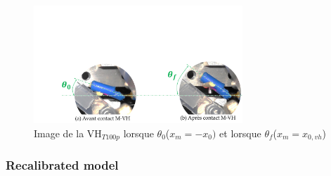\documentclass[3p,twocolumn,preprint]{elsarticle}
\begin{document}
\begin{figure}[!htbp]
	\begin{center}
		\captionsetup{justification=centering}
		\includegraphics[trim={4cm 0cm 0cm 9.5cm},clip,width=0.7\textwidth]{figures/contact_M_VH_lachers.pdf}
		\caption{Image de la VH$_{T100p}$ lorsque $\theta_0$($x_m=-x_{0})$ et lorsque $\theta_f$($x_m=x_{0,vh}$)}
		\label{fig:contact_M_VH_lachers}
	\end{center}
\end{figure}

	\subsubsection{Recalibrated model}
\end{document}
